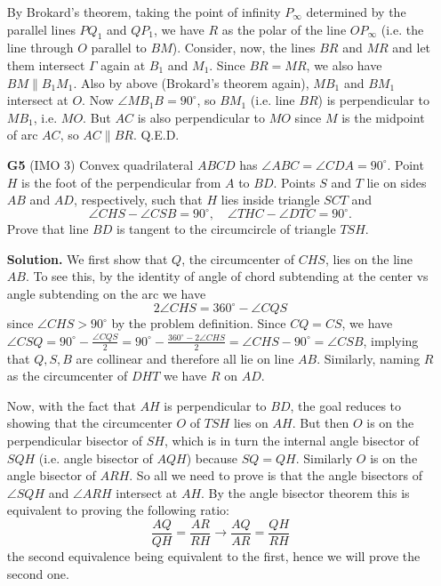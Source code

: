 \documentclass[11pt,a4paper]{article}
\begin{document}
\begin{enumerate}
	By Brokard's theorem, taking the point of infinity $P_{\infty}$ determined by the parallel lines $PQ_1$ and $QP_1$, we have $R$ as the polar of the line $OP_{\infty}$ (i.e. the line through $O$ parallel to $BM$). Consider, now, the lines $BR$ and $MR$ and let them intersect $\Gamma$ again at $B_1$ and $M_1$. Since $BR=MR$, we also have $BM\parallel B_1M_1$. Also by above (Brokard's theorem again), $MB_1$ and $BM_1$ intersect at $O$. Now $\angle MB_1B=90^{\circ}$, so $BM_1$ (i.e. line $BR$) is perpendicular to $MB_1$, i.e. $MO$. But $AC$ is also perpendicular to $MO$ since $M$ is the midpoint of arc $AC$, so $AC\parallel BR$. Q.E.D. 
	
	\item [\textbf{G5}] (IMO 3) Convex quadrilateral $ABCD$ has $\angle ABC = \angle CDA = 90^{\circ}$. Point $H$ is the foot of the perpendicular from $A$ to $BD$. Points $S$ and $T$ lie on sides $AB$ and $AD$, respectively, such that $H$ lies inside triangle $SCT$ and \[
	\angle CHS - \angle CSB = 90^{\circ}, \quad \angle THC - \angle DTC = 90^{\circ}. \] Prove that line $BD$ is tangent to the circumcircle of triangle $TSH$.
	
	\textbf{Solution.} We first show that $Q$, the circumcenter of $CHS$, lies on the line $AB$. To see this, by the identity of angle of chord subtending at the center vs angle subtending on the arc we have 
	\[2\angle CHS = 360^{\circ} - \angle CQS
	\]
	since $\angle CHS>90^{\circ}$ by the problem definition. 
	Since $CQ=CS$, we have $\angle CSQ = 90^{\circ} - \frac{\angle CQS}{2} = 90^{\circ} - \frac{360^{\circ} - 2\angle CHS}{2} = \angle CHS - 90^{\circ} = \angle CSB$, implying that $Q, S, B$ are collinear and therefore all lie on line $AB$. Similarly, naming $R$ as the circumcenter of $DHT$ we have $R$ on $AD$. 
	
	Now, with the fact that $AH$ is perpendicular to $BD$, the goal reduces to showing that the circumcenter $O$ of $TSH$ lies on $AH$. But then $O$ is on the perpendicular bisector of $SH$, which is in turn the internal angle bisector of $SQH$ (i.e. angle bisector of $AQH$) because $SQ=QH$. Similarly $O$ is on the angle bisector of $ARH$. So all we need to prove is that the angle bisectors of $\angle SQH$ and $\angle ARH$ intersect at $AH$. By the angle bisector theorem this is equivalent to proving the following ratio: 
	\[
	\frac{AQ}{QH} = \frac{AR}{RH}\to \frac{AQ}{AR} = \frac{QH}{RH}
	\]
	the second equivalence being equivalent to the first, hence we will prove the second one. 
	

\end{enumerate}
\end{document}
